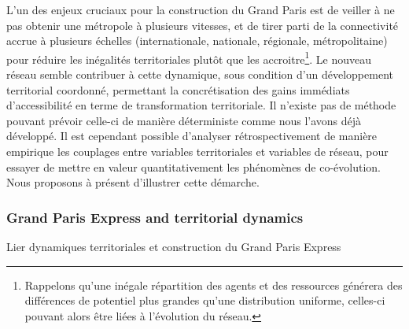 L'un des enjeux cruciaux pour la construction du Grand Paris est de veiller à ne pas obtenir une métropole à plusieurs vitesses, et de tirer parti de la connectivité accrue à plusieurs échelles (internationale, nationale, régionale, métropolitaine) pour réduire les inégalités territoriales plutôt que les accroitre\footnote{Rappelons qu'une inégale répartition des agents et des ressources générera des différences de potentiel plus grandes qu'une distribution uniforme, celles-ci pouvant alors être liées à l'évolution du réseau.}. Le nouveau réseau semble contribuer à cette dynamique, sous condition d'un développement territorial coordonné, permettant la concrétisation des gains immédiats d'accessibilité en terme de transformation territoriale. Il n'existe pas de méthode pouvant prévoir celle-ci de manière déterministe comme nous l'avons déjà développé. Il est cependant possible d'analyser rétrospectivement de manière empirique les couplages entre variables territoriales et variables de réseau, pour essayer de mettre en valeur quantitativement les phénomènes de co-évolution. Nous proposons à présent d'illustrer cette démarche.






\subsubsection{Grand Paris Express and territorial dynamics}{Lier dynamiques territoriales et construction du Grand Paris Express}





